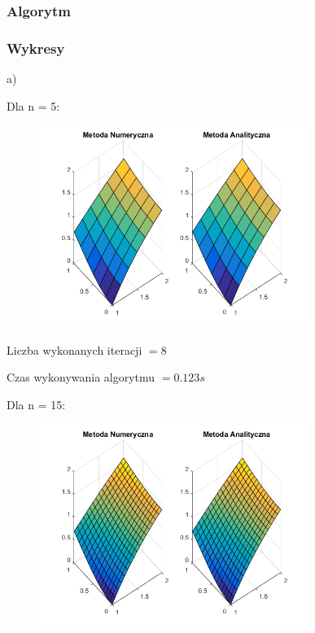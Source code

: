 \subsubsection{Algorytm}

\newpage
\subsubsection{Wykresy}

a)

Dla n = 5:

\begin{figure}[!ht]
	\begin{center}
		\includegraphics[width=0.78\textwidth]{Lab6/charts/pr/zad1/5.png}
	\end{center}
\end{figure}

Liczba wykonanych iteracji $ = 8 $

Czas wykonywania algorytmu $ = 0.123 s$


Dla n = 15:

\begin{figure}[!ht]
	\begin{center}
		\includegraphics[width=0.78\textwidth]{Lab6/charts/pr/zad1/15.png}
	\end{center}
\end{figure}


